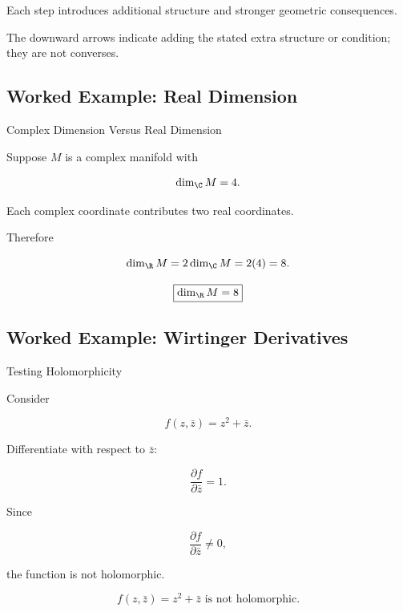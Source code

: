 Each step introduces additional structure and stronger geometric
consequences.

The downward arrows indicate adding the stated extra structure or
condition; they are not converses.

\subsection{Worked Example: Real Dimension}
\label{subsec:worked-complex-real-dimension}

\begin{workedexamplebox}{Complex Dimension Versus Real Dimension}

Suppose \(M\) is a complex manifold with

\[
\dim_{\C}M=4.
\]

Each complex coordinate contributes two real coordinates.

Therefore

\[
\dim_{\R}M
=
2\dim_{\C}M
=
2(4)
=
8.
\]

\begin{answerbox}
\[
\boxed{\dim_{\R}M=8}
\]
\end{answerbox}
\end{workedexamplebox}

\subsection{Worked Example: Wirtinger Derivatives}
\label{subsec:worked-wirtinger}

\begin{workedexamplebox}{Testing Holomorphicity}

Consider

\[
f(z,\bar z)=z^2+\bar z.
\]

Differentiate with respect to \(\bar z\):

\[
\frac{\partial f}{\partial\bar z}
=
1.
\]

Since

\[
\frac{\partial f}{\partial\bar z}\neq0,
\]

the function is not holomorphic.

\begin{answerbox}
\[
\boxed{
f(z,\bar z)=z^2+\bar z
\text{ is not holomorphic.}
}
\]
\end{answerbox}
\end{workedexamplebox}

